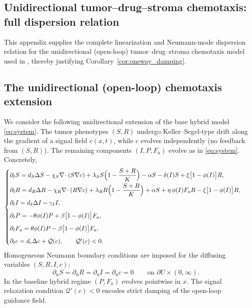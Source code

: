 \documentclass[pdflatex,sn-mathphys-ay]{sn-jnl}
\theoremstyle{thmstyleone}
\theoremstyle{definition}
\theoremstyle{remark}
\begin{document}
\begin{appendices}
\section{Unidirectional tumor--drug--stroma chemotaxis: full dispersion relation}\label{app:proof_corollary_oneway_damping}

This appendix supplies the complete linearization and Neumann-mode dispersion relation for the unidirectional (open-loop) tumor--drug--stroma chemotaxis model used in , thereby justifying Corollary~\ref{cor:oneway_damping}.  

\subsection{The unidirectional (open-loop) chemotaxis extension}
We consider the following unidirectional extension of the base hybrid model \eqref{eq:system}.  The tumor phenotypes $(S,R)$ undergo Keller--Segel-type drift along the gradient of a signal field $c(x,t)$, while $c$ evolves independently (no feedback from $(S,R)$).  The remaining components $(I,P,F_a)$ evolve as in \eqref{eq:system}.  Concretely,
\begin{align}
\label{eq:oneway_damping_final}
\begin{cases}
\partial_t S
= d_S\Delta S - \chi_S\nabla\!\cdot(S\nabla c)
+ \lambda_S S\Bigl(1-\dfrac{S+R}{K}\Bigr) - \alpha S - \delta(I)S + \xi\bigl[1-\phi(I)\bigr]R,\\[6pt]
\partial_t R
= d_R\Delta R - \chi_R\nabla\!\cdot(R\nabla c)
+ \lambda_R R\Bigl(1-\dfrac{S+R}{K}\Bigr) + \alpha S + \eta\,\phi(I)F_a R - \xi\bigl[1-\phi(I)\bigr]R,\\[6pt]
\partial_t I = d_I\Delta I - \gamma_I I,\\[6pt]
\partial_t P = -\theta \phi(I)P + \beta\bigl[1-\phi(I)\bigr]F_a,\\[6pt]
\partial_t F_a = \theta \phi(I)P - \beta\bigl[1-\phi(I)\bigr]F_a,\\[6pt]
\partial_t c = d_c \Delta c + \mathcal Q(c),
\qquad \mathcal Q'(c)<0.
\end{cases}
\end{align}
Homogeneous Neumann boundary conditions are imposed for the diffusing variables $(S,R,I,c)$:
\begin{equation}
\label{eq:neumann_bc_oneway_appendix}
\partial_{\mathrm n}S=\partial_{\mathrm n}R=\partial_{\mathrm n}I=\partial_{\mathrm n}c=0
\qquad\text{on }\partial U\times(0,\infty).
\end{equation}
In the baseline hybrid regime $(P,F_a)$ evolves pointwise in $x$. The signal relaxation condition $\mathcal Q'(c)<0$ encodes strict damping of the open-loop guidance field.


\end{appendices}
\end{document}
